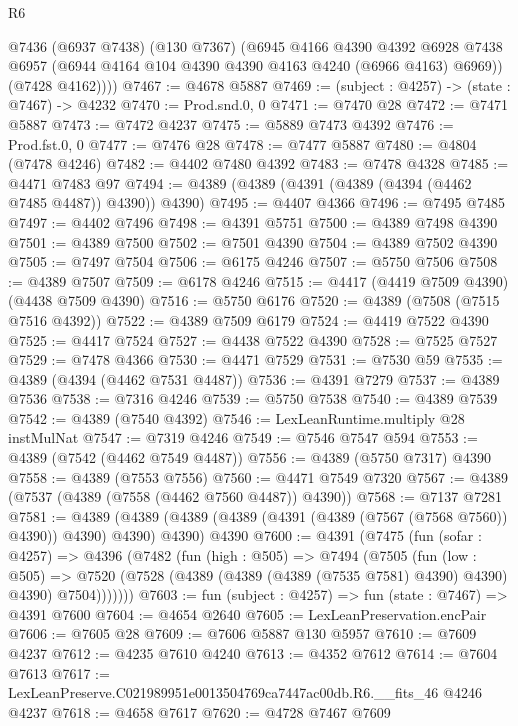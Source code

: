 \begin{lexlean}{R6}
\begin{coremodule}
        @7436
          (@6937 @7438)
          (@130 @7367)
          (@6945
            @4166
            @4390
            @4392
            @6928
            @7438
            @6957
            (@6944 @4164 @104 @4390 @4390 @4163 @4240 (@6966 @4163) @6969))
          (@7428 @4162))))
@7467 := @4678 @5887
@7469 := (subject : @4257) -> (state : @7467) -> @4232
@7470 := Prod.snd.{0, 0}
@7471 := @7470 @28
@7472 := @7471 @5887
@7473 := @7472 @4237
@7475 := @5889 @7473 @4392
@7476 := Prod.fst.{0, 0}
@7477 := @7476 @28
@7478 := @7477 @5887
@7480 := @4804 (@7478 @4246)
@7482 := @4402 @7480 @4392
@7483 := @7478 @4328
@7485 := @4471 @7483 @97
@7494 := @4389 (@4389 (@4391 (@4389 (@4394 (@4462 @7485 @4487)) @4390)) @4390)
@7495 := @4407 @4366
@7496 := @7495 @7485
@7497 := @4402 @7496
@7498 := @4391 @5751
@7500 := @4389 @7498 @4390
@7501 := @4389 @7500
@7502 := @7501 @4390
@7504 := @4389 @7502 @4390
@7505 := @7497 @7504
@7506 := @6175 @4246
@7507 := @5750 @7506
@7508 := @4389 @7507
@7509 := @6178 @4246
@7515 := @4417 (@4419 @7509 @4390) (@4438 @7509 @4390)
@7516 := @5750 @6176
@7520 := @4389 (@7508 (@7515 @7516 @4392))
@7522 := @4389 @7509 @6179
@7524 := @4419 @7522 @4390
@7525 := @4417 @7524
@7527 := @4438 @7522 @4390
@7528 := @7525 @7527
@7529 := @7478 @4366
@7530 := @4471 @7529
@7531 := @7530 @59
@7535 := @4389 (@4394 (@4462 @7531 @4487))
@7536 := @4391 @7279
@7537 := @4389 @7536
@7538 := @7316 @4246
@7539 := @5750 @7538
@7540 := @4389 @7539
@7542 := @4389 (@7540 @4392)
@7546 := LexLeanRuntime.multiply @28 instMulNat
@7547 := @7319 @4246
@7549 := @7546 @7547 @594
@7553 := @4389 (@7542 (@4462 @7549 @4487))
@7556 := @4389 (@5750 @7317) @4390
@7558 := @4389 (@7553 @7556)
@7560 := @4471 @7549 @7320
@7567 := @4389 (@7537 (@4389 (@7558 (@4462 @7560 @4487)) @4390))
@7568 := @7137 @7281
@7581 := @4389
    (@4389 (@4389 (@4389 (@4391 (@4389 (@7567 (@7568 @7560)) @4390)) @4390) @4390) @4390)
    @4390
@7600 := @4391
    (@7475
      (fun (sofar : @4257) =>
      @4396
        (@7482
          (fun (high : @505) =>
          @7494
            (@7505
              (fun (low : @505) =>
              @7520 (@7528 (@4389 (@4389 (@4389 (@7535 @7581) @4390) @4390) @4390) @7504)))))))
@7603 := fun (subject : @4257) => fun (state : @7467) => @4391 @7600
@7604 := @4654 @2640
@7605 := LexLeanPreservation.encPair
@7606 := @7605 @28
@7609 := @7606 @5887 @130 @5957
@7610 := @7609 @4237
@7612 := @4235 @7610 @4240
@7613 := @4352 @7612
@7614 := @7604 @7613
@7617 := LexLeanPreserve.C021989951e0013504769ca7447ac00db.R6.__fits_46 @4246 @4237
@7618 := @4658 @7617
@7620 := @4728 @7467 @7609

\end{coremodule}
\end{lexlean}
